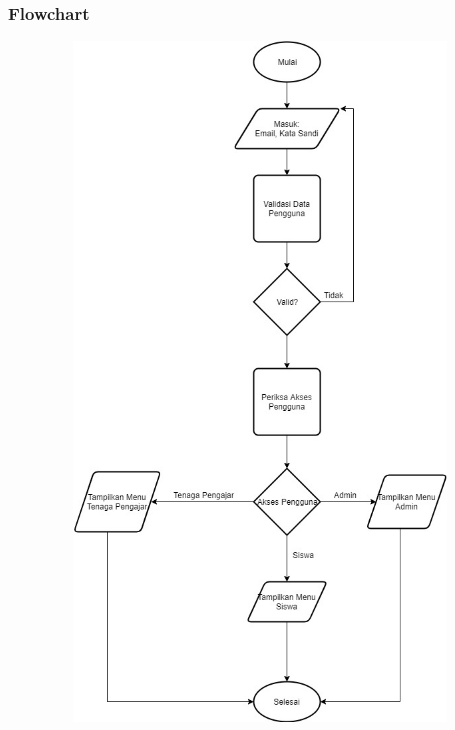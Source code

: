 \documentclass{scrreprt}
\begin{document}
		\subsubsection{Flowchart}
			\centering
				\includegraphics[width=15cm, height=18cm]{FlowChart.jpg}
		
		
\end{document}
